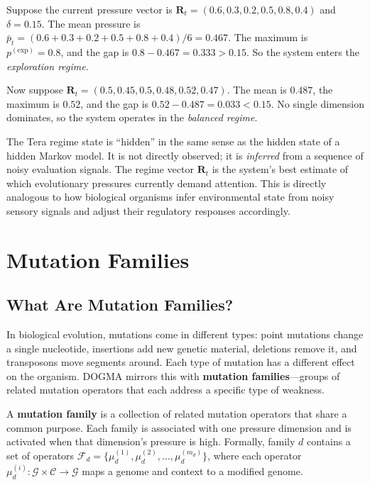 \begin{example}
Suppose the current pressure vector is $\mathbf{R}_t = (0.6, 0.3, 0.2, 0.5, 0.8, 0.4)$ and $\delta = 0.15$. The mean pressure is $\bar{p}_t = (0.6 + 0.3 + 0.2 + 0.5 + 0.8 + 0.4)/6 = 0.467$. The maximum is $p^{(\text{exp})} = 0.8$, and the gap is $0.8 - 0.467 = 0.333 > 0.15$. So the system enters the \emph{exploration regime}.

Now suppose $\mathbf{R}_t = (0.5, 0.45, 0.5, 0.48, 0.52, 0.47)$. The mean is $0.487$, the maximum is $0.52$, and the gap is $0.52 - 0.487 = 0.033 < 0.15$. No single dimension dominates, so the system operates in the \emph{balanced regime}.
\end{example}

\begin{keyinsight}
The Tera regime state is ``hidden'' in the same sense as the hidden state of a hidden Markov model. It is not directly observed; it is \emph{inferred} from a sequence of noisy evaluation signals. The regime vector $\mathbf{R}_t$ is the system's best estimate of which evolutionary pressures currently demand attention. This is directly analogous to how biological organisms infer environmental state from noisy sensory signals and adjust their regulatory responses accordingly.
\end{keyinsight}

\section{Mutation Families}
\label{sec:mutation-families}

\subsection{What Are Mutation Families?}

In biological evolution, mutations come in different types: point mutations change a single nucleotide, insertions add new genetic material, deletions remove it, and transposons move segments around. Each type of mutation has a different effect on the organism. DOGMA mirrors this with \textbf{mutation families}---groups of related mutation operators that each address a specific type of weakness.

\begin{definition}
A \textbf{mutation family} is a collection of related mutation operators that share a common purpose. Each family is associated with one pressure dimension and is activated when that dimension's pressure is high. Formally, family $d$ contains a set of operators $\mathcal{F}_d = \{\mu_d^{(1)}, \mu_d^{(2)}, \ldots, \mu_d^{(m_d)}\}$, where each operator $\mu_d^{(i)} : \mathcal{G} \times \mathcal{C} \to \mathcal{G}$ maps a genome and context to a modified genome.
\end{definition}

